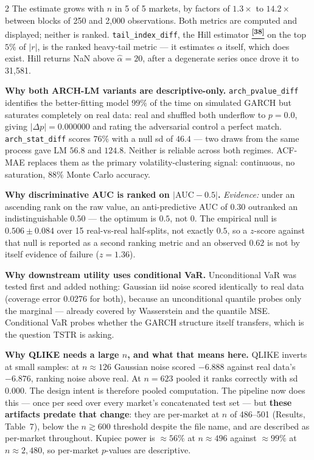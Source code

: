 \documentclass[10pt]{article}
\newcommand{\tcite}[1]{%
  \hyperlink{R:#1}{\textsuperscript{\scriptsize\textbf{[#1]}}}}
\begin{document}
\begin{multicols}{2}
\smallskip
The estimate grows with $n$ in 5 of 5 markets, by factors of \(1.3\times\) to \(14.2\times\) between blocks of 250 and 2,000 observations. Both metrics are computed and displayed; neither is ranked. \texttt{tail\_index\_diff}, the Hill estimator\tcite{38} on the top $5\%$ of $|r|$, is the ranked heavy-tail metric --- it estimates $\alpha$ itself, which does exist. Hill returns NaN above $\hat\alpha=20$, after a degenerate series once drove it to 31{,}581.

\columnbreak

\textbf{Why both ARCH-LM variants are descriptive-only.}
\texttt{arch\_pvalue\_diff} identifies the better-fitting model $99\%$ of the time on simulated GARCH but saturates completely on real data: real and shuffled both underflow to $p=0.0$, giving $|\Delta p|=0.000000$ and rating the adversarial control a perfect match. \texttt{arch\_stat\_diff} scores $76\%$ with a null sd of $46.4$ --- two draws from the same process gave LM $56.8$ and $124.8$. Neither is reliable across both regimes. ACF-MAE replaces them as the primary volatility-clustering signal: continuous, no saturation, $88\%$ Monte Carlo accuracy.

\smallskip
\textbf{Why discriminative AUC is ranked on $|\text{AUC}-0.5|$.}
\textit{Evidence:} under an ascending rank on the raw value, an anti-predictive AUC of $0.30$ outranked an indistinguishable $0.50$ --- the optimum is $0.5$, not $0$. The empirical null is $0.506\pm0.084$ over 15 real-vs-real half-splits, not exactly $0.5$, so a $z$-score against that null is reported as a second ranking metric and an observed $0.62$ is not by itself evidence of failure ($z=1.36$).

\smallskip
\textbf{Why downstream utility uses conditional VaR.}
Unconditional VaR was tested first and added nothing: Gaussian iid noise scored identically to real data (coverage error 0.0276 for both), because an unconditional quantile probes only the marginal --- already covered by Wasserstein and the quantile MSE. Conditional VaR probes whether the GARCH structure itself transfers, which is the question TSTR is asking.

\smallskip
\textbf{Why QLIKE needs a large $n$, and what that means here.}
QLIKE inverts at small samples: at $n\approx126$ Gaussian noise scored $-6.888$ against real data's $-6.876$, ranking noise above real. At $n=623$ pooled it ranks correctly with sd $0.000$. The design intent is therefore pooled computation. The pipeline now does this --- once per seed over every market's concatenated test set --- but \textbf{these artifacts predate that change}: they are per-market at $n$ of 486--501 (Results, Table~7), below the $n\gtrsim600$ threshold despite the file name, and are described as per-market throughout. Kupiec power is $\approx56\%$ at $n\approx496$ against $\approx99\%$ at $n\approx2{,}480$, so per-market $p$-values are descriptive.


\end{multicols}
\end{document}
